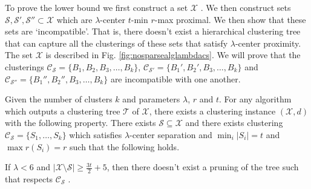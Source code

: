 \documentclass[anon,12pt]{colt2016} %
\newcommand{\mc}{\mathcal}
\begin{document}
To prove the lower bound we first construct a set $\mc X$ . We then construct sets $\mc S, \mc S', \mc S'' \subset \mc X$ which are $\lambda$-center $t$-min $r$-max proximal. We then show that these sets are `incompatible'. That is, there doesn't exist a  hierarchical clustering tree that can capture all the clusterings of these sets that satisfy $\lambda$-center proximity. The set $\mc X$ is described in Fig. \ref{fig:nosparsealglambdacs}. We will prove that the clusterings $\mc C_{\mc S} = \{B_1, B_2, B_3, \ldots, B_k\}$, $\mc C_{\mc S'} = \{B_1', B_2', B_3, \ldots, B_k\}$ and $\mc C_{\mc S''} = \{B_1'', B_2'', B_3, \ldots, B_k\}$ are incompatible with one another.

\begin{theorem}
Given the number of clusters $k$ and parameters $\lambda$, $r$ and $t$. For any algorithm which outputs a clustering tree $\mc T$ of $\mc X$, there exists a clustering instance $(\mc X, d)$ with the following property. There exists $\mc S \subseteq \mc X$ and there exists clustering $\mc C_{\mc S} = \{S_1, \ldots, S_k\}$ which satisfies $\lambda$-center separation and $\min_i |S_i| = t$ and $\max r(S_i) = r$ such that the following holds.

If $\lambda < 6$ and $|\mc X\setminus \mc S|\ge \frac{3t}{2}+5$, then there doesn't exist a pruning of the tree such that respects $\mc C_{\mc S}$ .
\end{theorem}
\end{document}
